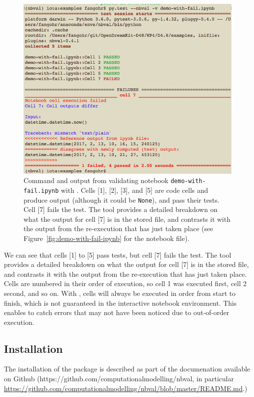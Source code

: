 \documentclass{deliverablereport}
\begin{document}
\begin{figure}[ht]
  \centering
  \includegraphics[width=1\textwidth]{examples/demo-with-fail-pytest.png}
  \caption{\nbval Command and output from validating notebook
    \texttt{demo-with-fail.ipynb} with \nbval. Cells [1], [2], [3],
    and [5] are code cells and produce output (although it could be
    \texttt{None}), and pass their tests. Cell [7] fails the test. The
    tool provides a detailed breakdown on what the output for cell [7]
    is in the stored file, and contrasts it with the output from the
    re-execution that has just taken place (see
    Figure~\ref{fig:demo-with-fail-ipynb} for the notebook
    file).\label{fig:demo-with-fail-pytest}}
\end{figure}

We can see that cells [1] to [5] pass tests, but cell [7] fails the test. The
tool provides a detailed breakdown on what the output for cell [7]
is in the stored file, and contrasts it with the output from the
re-execution that has just taken place.
Cells are numbered in their order of execution,
so cell 1 was executed first, cell 2 second, and so on.
With \nbval, cells will always be executed in order from start to finish,
which is not guaranteed in the interactive notebook environment.
This enables \nbval to catch errors that may not have been noticed due to
out-of-order execution.


\clearpage
\subsection{Installation}\label{sec:installation}
The installation of the package is described as part of the
documenation available on Github
(https://github.com/computationalmodelling/nbval, in particular\linebreak
\href{https://github.com/computationalmodelling/nbval/blob/master/README.md}{https://github.com/computationalmodelling/nbval/blob/master/README.md}.)
\end{document}

